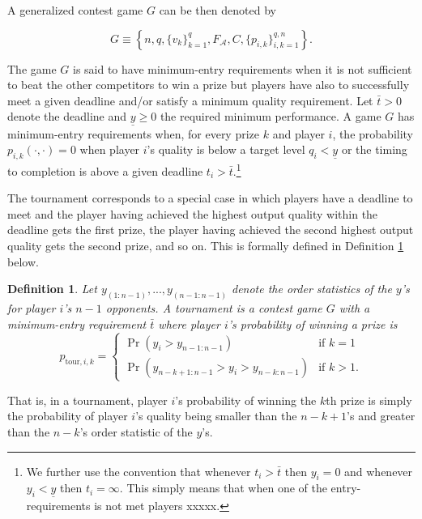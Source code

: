 \documentclass[12pt,]{article}
\theoremstyle{plain} %
\newtheorem{define}{Definition}
\newcommand\deadline{\bar{t}}
\newcommand\target{\underline{y}}
\newcommand\tournament{\text{tour}}
\begin{document}
A generalized contest game \(G\) can be then denoted by

\begin{equation}
G \equiv \left\{
    n, q, \{v_k\}_{k=1}^{q},  F_\mathcal{A}, C, \{p_{i,k}\}_{i,k=1}^{q,n} 
  \right\}.
\end{equation}

The game \(G\) is said to have minimum-entry requirements when it is not
sufficient to beat the other competitors to win a prize but players have
also to successfully meet a given deadline and/or satisfy a minimum
quality requirement. Let \(\deadline>0\) denote the deadline and
\(\target\geq 0\) the required minimum performance. A game \(G\) has
minimum-entry requirements when, for every prize \(k\) and player \(i\),
the probability \(p_{i, k}(\cdot, \cdot)=0\) when player \(i\)'s quality
is below a target level \(q_i < \target\) or the timing to completion is
above a given deadline \(t_i>\deadline\).\footnote{We further use the
  convention that whenever \(t_i> \deadline\) then \(y_i=0\) and
  whenever \(y_i<\target\) then \(t_i = \infty\). This simply means that
  when one of the entry-requirements is not met players xxxxx.}

The tournament corresponds to a special case in which players have a
deadline to meet and the player having achieved the highest output
quality within the deadline gets the first prize, the player having
achieved the second highest output quality gets the second prize, and so
on. This is formally defined in Definition \ref{tournament} below.

\begin{define} \label{tournament}
Let $y_{(1:n-1)}, ..., y_{(n-1:n-1)}$ denote the order statistics of the $y$'s for player $i$'s $n-1$ opponents. A tournament is a contest game $G$ with a minimum-entry requirement $\deadline$ where player $i$'s probability of winning a prize is
\begin{equation}
  p_{\tournament, i, k} =
  \begin{cases}
    \Pr(y_i > y_{n-1:n-1}) & \text{if }k=1\\
    \Pr(y_{n-k+1:n-1} > y_i > y_{n-k:n-1}) & \text{if }k>1.
  \end{cases}
\end{equation}
\end{define}

That is, in a tournament, player \(i\)'s probability of winning the
\(k\)th prize is simply the probability of player \(i\)'s quality being
smaller than the \(n-k+1\)'s and greater than the \(n-k\)'s order
statistic of the \(y\)'s.
\end{document}
